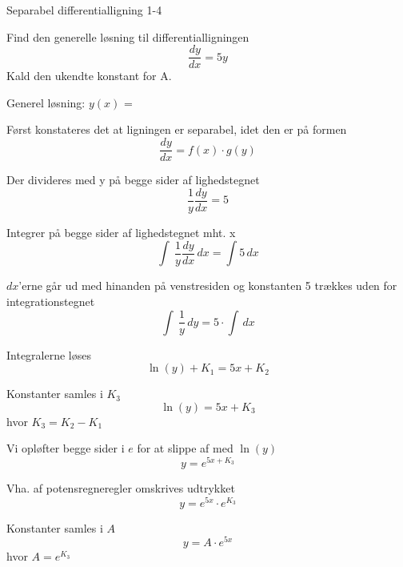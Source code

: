 \documentclass{article}
\begin{document}
\newpage

\begin{exercise}{Separabel differentialligning 1-4}

	
	Find den generelle løsning til differentialligningen 
	\[
	\frac{dy}{dx} = 5y
	\]
	Kald den ukendte konstant for A.
	
	Generel løsning: $y(x)$ = 
	
	\hint
	
	Først konstateres det at ligningen er separabel, idet den er på formen
	\[
	\frac{dy}{dx} = f(x) \cdot g(y)
	\]
	
	\hint 
	Der divideres med y på begge sider af lighedstegnet
	\[
	\frac{1}{y} \frac{dy}{dx} = 5
	\]
	
	\hint
	
	Integrer på begge sider af lighedstegnet mht. x
	\[
	\int\ \frac{1}{y} \frac{dy}{dx} \, dx= \int 5 \,dx
	\]
	
	\hint
	
	$dx$'erne går ud med hinanden på venstresiden og konstanten 5 trækkes uden for integrationstegnet
	\[
	\int\ \frac{1}{y}\, dy= 5 \cdot \int \,dx
	\]
	
	\hint
	
	Integralerne løses
	\[
	\ln(y) + K_1 =5x + K_2
	\]
	
	
	\hint
	
	Konstanter samles i $K_3$
	\[
	\ln(y) =5x + K_3
	\]
	hvor $K_3=K_2-K_1$
	
	\hint 
	
	Vi opløfter begge sider i $e$ for at slippe af med $\ln(y)$
	\[
	y = e^{5x+K_3}
	\]
	
	\hint
	
	Vha.  af potensregneregler omskrives udtrykket
	\[
	y = e^{5x} \cdot e^{K_3}
	\]
	
	\hint
	
	Konstanter samles i $A$
	\[
	y = A \cdot e^{5x}
	\]
	hvor $ A= e^{K_3}$
	
	\end{exercise}

\newpage
\end{document}

